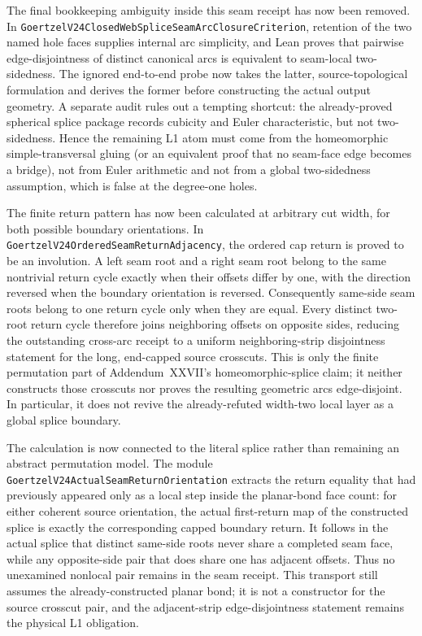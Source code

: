 \documentclass[11pt]{article}
\theoremstyle{definition}
\begin{document}
The final bookkeeping ambiguity inside this seam receipt has now been removed.
In
\texttt{GoertzelV24ClosedWebSpliceSeamArcClosureCriterion}, retention of the
two named hole faces supplies internal arc simplicity, and Lean proves that
pairwise edge-disjointness of distinct canonical arcs is equivalent to
seam-local two-sidedness.  The ignored end-to-end probe now takes the latter,
source-topological formulation and derives the former before constructing the
actual output geometry.  A separate audit rules out a tempting shortcut: the
already-proved spherical splice package records cubicity and Euler
characteristic, but not two-sidedness.  Hence the remaining L1 atom must come
from the homeomorphic simple-transversal gluing (or an equivalent proof that
no seam-face edge becomes a bridge), not from Euler arithmetic and not from a
global two-sidedness assumption, which is false at the degree-one holes.

The finite return pattern has now been calculated at arbitrary cut width, for
both possible boundary orientations.  In
\texttt{GoertzelV24OrderedSeamReturnAdjacency}, the ordered cap return is proved
to be an involution.  A left seam root and a right seam root belong to the same
nontrivial return cycle exactly when their offsets differ by one, with the
direction reversed when the boundary orientation is reversed.  Consequently
same-side seam roots belong to one return cycle only when they are equal.
Every distinct two-root return cycle therefore joins neighboring offsets on
opposite sides, reducing the outstanding cross-arc receipt to a uniform
neighboring-strip disjointness statement for the long, end-capped source
crosscuts.  This is only the finite permutation part of Addendum~XXVII's
homeomorphic-splice claim; it neither constructs those crosscuts nor proves
the resulting geometric arcs edge-disjoint.  In
particular, it does not revive the already-refuted width-two local layer as a
global splice boundary.

The calculation is now connected to the literal splice rather than remaining
an abstract permutation model.  The module
\texttt{GoertzelV24ActualSeamReturnOrientation} extracts the return equality
that had previously appeared only as a local step inside the planar-bond face
count: for either coherent source orientation, the actual first-return map of
the constructed splice is exactly the corresponding capped boundary return.
It follows in the actual splice that distinct same-side roots never share a
completed seam face, while any opposite-side pair that does share one has
adjacent offsets.  Thus no unexamined nonlocal pair remains in the seam
receipt.  This transport still assumes the already-constructed planar bond;
it is not a constructor for the source crosscut pair, and the adjacent-strip
edge-disjointness statement remains the physical L1 obligation.
\end{document}
